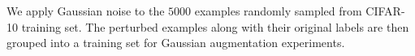 


We apply Gaussian noise to the $5000$ examples randomly sampled from CIFAR-10 training set. The perturbed examples along with their original labels are then grouped into a training set for Gaussian augmentation experiments. 



